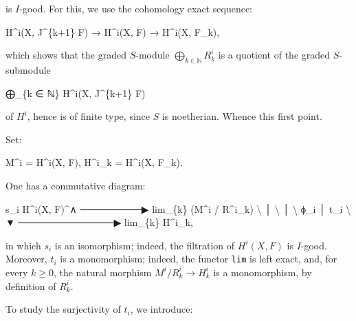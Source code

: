 \documentclass[
  11pt,
  a4paper,
]{book}
\newenvironment{Shaded}{}{}
\newcommand{\NormalTok}[1]{#1}
\begin{document}
is \(I\)-good. For this, we use the cohomology exact sequence:

\begin{Shaded}
\begin{Highlighting}[]
\NormalTok{H\^{}i(X, J\^{}\{k+1\} F) → H\^{}i(X, F) → H\^{}i(X, F\_k),}
\end{Highlighting}
\end{Shaded}

which shows that the graded \(S\)-module
\(\bigoplus_{k \in \mathbb{N}} R^{i}_{k}\) is a quotient of the graded
\(S\)-submodule

\begin{Shaded}
\begin{Highlighting}[]
\NormalTok{⨁\_\{k ∈ ℕ\} H\^{}i(X, J\^{}\{k+1\} F)}
\end{Highlighting}
\end{Shaded}

of \(H^{i}\), hence is of finite type, since \(S\) is noetherian. Whence
this first point.

Set:

\begin{Shaded}
\begin{Highlighting}[]
\NormalTok{M\^{}i = H\^{}i(X, F),    H\^{}i\_k = H\^{}i(X, F\_k).}
\end{Highlighting}
\end{Shaded}

One has a commutative diagram:

\begin{Shaded}
\begin{Highlighting}[]
\NormalTok{                     s\_i}
\NormalTok{   H\^{}i(X, F)\^{}∧  ─────────▶  lim\_\{k\} (M\^{}i / R\^{}i\_k)}
\NormalTok{        \textbackslash{}                         │}
\NormalTok{         \textbackslash{}                        │}
\NormalTok{          \textbackslash{} ϕ\_i                   │ t\_i}
\NormalTok{           \textbackslash{}                      ▼}
\NormalTok{            ──────────────▶  lim\_\{k\} H\^{}i\_k,}
\end{Highlighting}
\end{Shaded}

in which \(s_{i}\) is an isomorphism; indeed, the filtration of
\(H^{i}(X, F)\) is \(I\)-good. Moreover, \(t_{i}\) is a monomorphism;
indeed, the functor \texttt{lim} is left exact, and, for every
\(k \geqslant 0\), the natural morphism \(M^{i} /
R^{i}_{k} \to H^{i}_{k}\) is a monomorphism, by definition of
\(R^{i}_{k}\).

To study the surjectivity of \(t_{i}\), we introduce:
\end{document}
